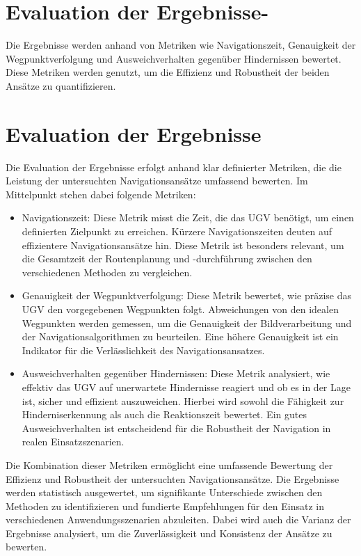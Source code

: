 \section{Evaluation der Ergebnisse-}

Die Ergebnisse werden anhand von Metriken wie Navigationszeit, Genauigkeit der Wegpunktverfolgung und Ausweichverhalten gegenüber Hindernissen bewertet. 
Diese Metriken werden genutzt, um die Effizienz und Robustheit der beiden Ansätze zu quantifizieren.


\section{Evaluation der Ergebnisse}

Die Evaluation der Ergebnisse erfolgt anhand klar definierter Metriken, die die Leistung der untersuchten Navigationsansätze umfassend bewerten. 
Im Mittelpunkt stehen dabei folgende Metriken:

\begin{itemize}
    \item Navigationszeit: Diese Metrik misst die Zeit, die das \ac{UGV} benötigt, um einen definierten Zielpunkt zu erreichen. Kürzere Navigationszeiten deuten auf effizientere Navigationsansätze hin. Diese Metrik ist besonders relevant, um die Gesamtzeit der Routenplanung und -durchführung zwischen den verschiedenen Methoden zu vergleichen.
    
    \item Genauigkeit der Wegpunktverfolgung: Diese Metrik bewertet, wie präzise das \ac{UGV} den vorgegebenen Wegpunkten folgt. Abweichungen von den idealen Wegpunkten werden gemessen, um die Genauigkeit der Bildverarbeitung und der Navigationsalgorithmen zu beurteilen. Eine höhere Genauigkeit ist ein Indikator für die Verlässlichkeit des Navigationsansatzes.
    
    \item Ausweichverhalten gegenüber Hindernissen: Diese Metrik analysiert, wie effektiv das \ac{UGV} auf unerwartete Hindernisse reagiert und ob es in der Lage ist, sicher und effizient auszuweichen. Hierbei wird sowohl die Fähigkeit zur Hinderniserkennung als auch die Reaktionszeit bewertet. Ein gutes Ausweichverhalten ist entscheidend für die Robustheit der Navigation in realen Einsatzszenarien.
\end{itemize}

Die Kombination dieser Metriken ermöglicht eine umfassende Bewertung der Effizienz und Robustheit der untersuchten Navigationsansätze. 
Die Ergebnisse werden statistisch ausgewertet, um signifikante Unterschiede zwischen den Methoden zu identifizieren und fundierte Empfehlungen für den Einsatz in verschiedenen Anwendungsszenarien abzuleiten. 
Dabei wird auch die Varianz der Ergebnisse analysiert, um die Zuverlässigkeit und Konsistenz der Ansätze zu bewerten.
